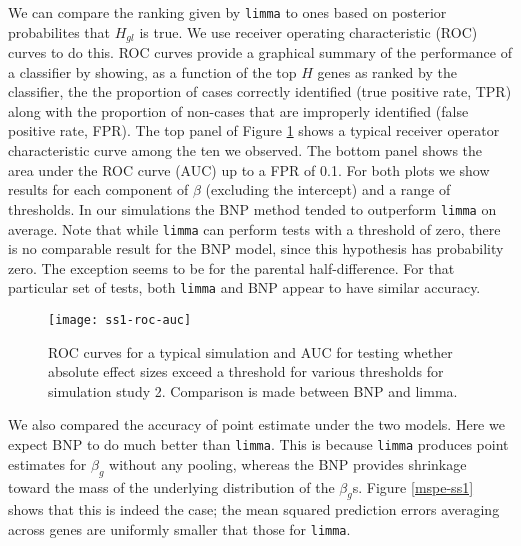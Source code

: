 \begin{itemize}
We can compare the ranking given by \texttt{limma} to ones based on posterior probabilites that $H_{gl}$ is true. We use receiver operating characteristic (ROC) curves to do this. ROC curves provide a graphical summary of the performance of a classifier by showing, as a function of the top $H$ genes as ranked by the classifier, the the proportion of cases correctly identified (true positive rate, TPR) along with the proportion of non-cases that are improperly identified (false positive rate, FPR). The top panel of Figure \ref{roc-ss1} shows a typical receiver operator characteristic curve among the ten we observed. The bottom panel shows the area under the ROC curve (AUC) up to a FPR of 0.1. For both plots we show results for each component of $\beta$ (excluding the intercept) and a range of thresholds. In our simulations the BNP method tended to outperform \texttt{limma} on average. Note that while \texttt{limma} can perform tests with a threshold of zero, there is no comparable result for the BNP model, since this hypothesis has probability zero. The exception seems to be for the parental half-difference. For that particular set of tests, both \texttt{limma} and BNP appear to have similar accuracy.
% 
\begin{figure}[ht!]
\centering
\texttt{[image: ss1-roc-auc]}
\begin{minipage}{.8\textwidth}
\caption{\small ROC curves for a typical simulation and AUC for testing whether absolute effect sizes exceed a threshold for various thresholds for simulation study 2. Comparison is made between BNP and limma.}
\label{roc-ss1}
\end{minipage}
\end{figure}

We also compared the accuracy of point estimate under the two models. Here we expect BNP to do much better than \texttt{limma}. This is because \texttt{limma} produces point estimates for $\beta_g$ without any pooling, whereas the BNP provides shrinkage toward the mass of the underlying distribution of the $\beta_g$s. Figure \ref{mspe-ss1} shows that this is indeed the case; the mean squared prediction errors averaging across genes are uniformly smaller that those for \texttt{limma}.


\end{itemize}

